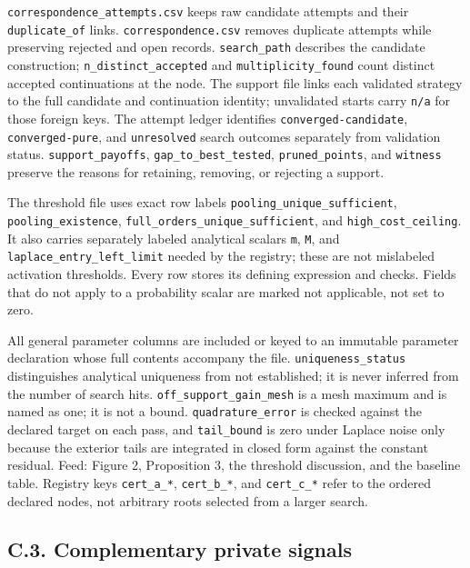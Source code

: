 \documentclass[
  11pt,
]{article}
\begin{document}
\texttt{correspondence\_attempts.csv} keeps raw candidate attempts and
their \texttt{duplicate\_of} links. \texttt{correspondence.csv} removes
duplicate attempts while preserving rejected and open records.
\texttt{search\_path} describes the candidate construction;
\texttt{n\_distinct\_accepted} and \texttt{multiplicity\_found} count
distinct accepted continuations at the node. The support file links each
validated strategy to the full candidate and continuation identity;
unvalidated starts carry \texttt{n/a} for those foreign keys. The
attempt ledger identifies \texttt{converged-candidate},
\texttt{converged-pure}, and \texttt{unresolved} search outcomes
separately from validation status. \texttt{support\_payoffs},
\texttt{gap\_to\_best\_tested}, \texttt{pruned\_points}, and
\texttt{witness} preserve the reasons for retaining, removing, or
rejecting a support.

The threshold file uses exact row labels
\texttt{pooling\_unique\_sufficient}, \texttt{pooling\_existence},
\texttt{full\_orders\_unique\_sufficient}, and
\texttt{high\_cost\_ceiling}. It also carries separately labeled
analytical scalars \texttt{m}, \texttt{M}, and
\texttt{laplace\_entry\_left\_limit} needed by the registry; these are
not mislabeled activation thresholds. Every row stores its defining
expression and checks. Fields that do not apply to a probability scalar
are marked not applicable, not set to zero.

All general parameter columns are included or keyed to an immutable
parameter declaration whose full contents accompany the file.
\texttt{uniqueness\_status} distinguishes analytical uniqueness from not
established; it is never inferred from the number of search hits.
\texttt{off\_support\_gain\_mesh} is a mesh maximum and is named as one;
it is not a bound. \texttt{quadrature\_error} is checked against the
declared target on each pass, and \texttt{tail\_bound} is zero under
Laplace noise only because the exterior tails are integrated in closed
form against the constant residual. Feed: Figure 2, Proposition 3, the
threshold discussion, and the baseline table. Registry keys
\texttt{cert\_a\_*}, \texttt{cert\_b\_*}, and \texttt{cert\_c\_*} refer
to the ordered declared nodes, not arbitrary roots selected from a
larger search.

\subsection{C.3. Complementary private signals}\label{oa-c-signals}
\end{document}
